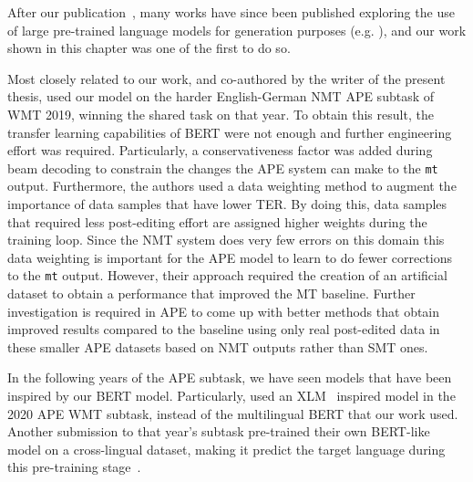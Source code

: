 After our publication~\citep{Correia2019}, many works have since been
published exploring the use of large pre-trained language models for
generation purposes (e.g.
\citep{zhang2019PretrainingBasedNaturalLanguage,
    chen2020DistillingKnowledgeLearned}), and our work shown in this
chapter was one of the first to do so. %

Most closely related to our work, and co-authored by the writer of
the present thesis, \citet{lopes2019unbabels} used our model on the
harder English-German NMT APE subtask of WMT 2019, winning the shared
task on that year. To obtain this result, the transfer learning
capabilities of BERT were not enough and further engineering effort
was required. Particularly, a conservativeness factor was added
during beam decoding to constrain the changes the APE system can make
to the {\tt mt} output. Furthermore, the authors used a data
weighting method to augment the importance of data samples that have
lower TER. By doing this, data samples that required less
post-editing effort are assigned higher weights during the training
loop. Since the NMT system does very few errors on this domain this
data weighting is important for the APE model to learn to do fewer
corrections to the {\tt mt} output. However, their approach required
the creation of an artificial dataset to obtain a performance that
improved the MT baseline. Further investigation is required in APE to
come up with better methods that obtain improved results compared to
the baseline using only real post-edited data in these smaller APE
datasets based on NMT outputs rather than SMT ones.

In the following years of the APE subtask, we have seen models that
have been inspired by our BERT model. Particularly,
\citet{lee2020POSTECHETRISubmissionWMT2020} used an
XLM~\citep{lample2019xlm} inspired model in the 2020 APE WMT subtask,
instead of the multilingual BERT that our work used. Another
submission to that year's subtask pre-trained their own BERT-like
model on a cross-lingual dataset, making it predict the target
language during this pre-training
stage~\citep{wang2020AlibabaSubmissionWMT}.

